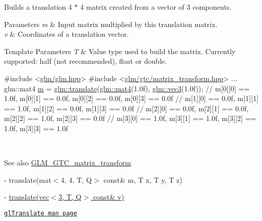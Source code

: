 Builds a translation 4 $\ast$ 4 matrix created from a vector of 3 components.


\begin{DoxyParams}{Parameters}
{\em m} & Input matrix multiplied by this translation matrix. \\
\hline
{\em v} & Coordinates of a translation vector. \\
\hline
\end{DoxyParams}

\begin{DoxyTemplParams}{Template Parameters}
{\em T} & Value type used to build the matrix. Currently supported\+: half (not recommended), float or double. 
\begin{DoxyCode}
\textcolor{preprocessor}{#include <\hyperlink{glm_8hpp}{glm/glm.hpp}>}
\textcolor{preprocessor}{#include <\hyperlink{matrix__transform_8hpp}{glm/gtc/matrix\_transform.hpp}>}
...
glm::mat4 \hyperlink{_s_d_l__opengl__glext_8h_af593500c283bf1a787a6f947f503a5c2}{m} = \hyperlink{group__gtc__matrix__transform_ga1a4ecc4ad82652b8fb14dcb087879284}{glm::translate}(\hyperlink{structglm_1_1mat}{glm::mat4}(1.0f), \hyperlink{structglm_1_1vec}{glm::vec3}(1.0f));
\textcolor{comment}{// m[0][0] == 1.0f, m[0][1] == 0.0f, m[0][2] == 0.0f, m[0][3] == 0.0f}
\textcolor{comment}{// m[1][0] == 0.0f, m[1][1] == 1.0f, m[1][2] == 0.0f, m[1][3] == 0.0f}
\textcolor{comment}{// m[2][0] == 0.0f, m[2][1] == 0.0f, m[2][2] == 1.0f, m[2][3] == 0.0f}
\textcolor{comment}{// m[3][0] == 1.0f, m[3][1] == 1.0f, m[3][2] == 1.0f, m[3][3] == 1.0f}
\end{DoxyCode}
 \\
\hline
\end{DoxyTemplParams}
\begin{DoxySeeAlso}{See also}
\hyperlink{group__gtc__matrix__transform}{G\+L\+M\+\_\+\+G\+T\+C\+\_\+matrix\+\_\+transform} 

-\/ translate(mat$<$4, 4, T, Q$>$ const\& m, T x, T y, T z) 

-\/ \hyperlink{group__gtx__transform_ga309a30e652e58c396e2c3d4db3ee7658}{translate(vec$<$3, T, Q$>$ const\& v)} 

\href{https://www.khronos.org/registry/OpenGL-Refpages/gl2.1/xhtml/glTranslate.xml}{\tt gl\+Translate man page} 
\end{DoxySeeAlso}
\mbox{\label{group__gtc__matrix__transform_gaaeacc04a2a6f4b18c5899d37e7bb3ef9}} 
